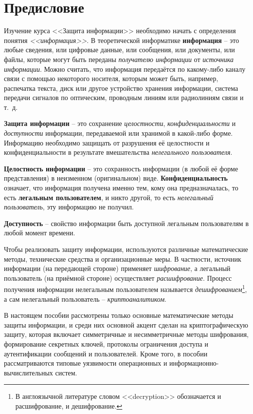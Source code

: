 \chapter*{Предисловие}

Изучение курса <<Защита информации>> необходимо начать с определения понятия \emph{<<информация>>}. В теоретической информатике \textbf{информация} -- это любые сведения, или цифровые данные, или сообщения, или документы, или файлы, которые могут быть переданы \emph{получателю информации} от \emph{источника информации}. Можно считать, что информация передаётся по какому-либо каналу связи с помощью некоторого носителя, которым может быть, например, распечатка текста, диск или другое устройство хранения информации, система передачи сигналов по оптическим, проводным линиям или радиолиниям связи и т.~д.

\textbf{Защита информации} -- это сохранение \emph{целостности}, \emph{конфиденциальности} и \emph{доступности} информации, передаваемой или хранимой в какой-либо форме. Информацию необходимо защищать от разрушения её целостности и конфиденциальности в результате вмешательства \emph{нелегального пользователя}.

\textbf{Целостность информации} -- это сохранность информации (в любой её форме представления) в неизменном (оригинальном) виде. \textbf{Конфиденциальность} означает, что информация получена именно тем, кому она предназначалась, то есть \textbf{легальным пользователем}, и никто другой, то есть \emph{нелегальный пользователь}, эту информацию не получил.

\textbf{Доступность} -- свойство информации быть доступной легальным пользователям в любой момент времени.

Чтобы реализовать защиту информации, используются различные математические методы, технические средства и организационные меры. В частности, источник информации (на передающей стороне) применяет \emph{шифрование}, а легальный пользователь (на приёмной стороне) осуществляет \emph{расшифрование}. Процесс получения информации нелегальным пользователем называется \emph{дешифрованием}\footnote{В англоязычной литературе словом <<decryption>> обозначается и расшифрование, и дешифрование.}, а сам нелегальный пользователь -- \emph{криптоаналитиком}.

В настоящем пособии рассмотрены только основные математические методы защиты информации, и среди них основной акцент сделан на криптографическую защиту, которая включает симметричные и несимметричные методы шифрования, формирование секретных ключей, протоколы ограничения доступа и аутентификации сообщений и пользователей. Кроме того, в пособии рассматриваются типовые уязвимости операционных и информационно-вычислительных систем.

